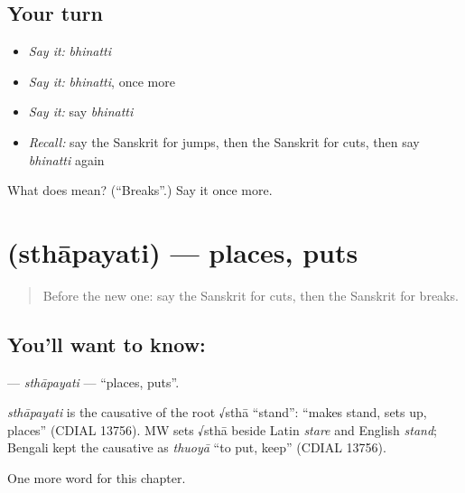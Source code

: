 \subsection*{Your turn}
\begin{itemize}
\raggedright
  \item \emph{Say it:} \emph{bhinatti}
  \item \emph{Say it:} \emph{bhinatti}, once more
  \item \emph{Say it:} say \emph{bhinatti}
  \item \emph{Recall:} say the Sanskrit for jumps, then the Sanskrit for cuts, then say \emph{bhinatti} again
\end{itemize}

\begin{tcolorbox}[breakable,colback=teal!4,colframe=teal!35!black,title={Before you move on}]
What does  mean? (\textquotedblleft{}Breaks\textquotedblright{}.) Say it once more.
\end{tcolorbox}
\section[\texorpdfstring{\sk{स्थापयति} (sthāpayati)}{स्थापयति (sthāpayati)}]{ (sthāpayati) — places, puts}

\label{lesson:SA-C134-sthapayati}



\begin{quote}
Before the new one: say the Sanskrit for cuts, then the Sanskrit for breaks.
\end{quote}

\subsection*{You'll want to know: }
\textbf{} — \emph{sthāpayati} — \textquotedblleft{}places, puts\textquotedblright{}.

\begin{cousinweb}
\emph{sthāpayati} is the causative of the root √sthā \textquotedblleft{}stand\textquotedblright{}: \textquotedblleft{}makes stand, sets up, places\textquotedblright{} (CDIAL 13756). MW sets √sthā beside Latin \emph{stare} and English \emph{stand}; Bengali kept the causative as \emph{thuoyā} \textquotedblleft{}to put, keep\textquotedblright{} (CDIAL 13756).
\end{cousinweb}

\begin{grammarlens}[title={What you've built}]
One more word for this chapter.
\end{grammarlens}

